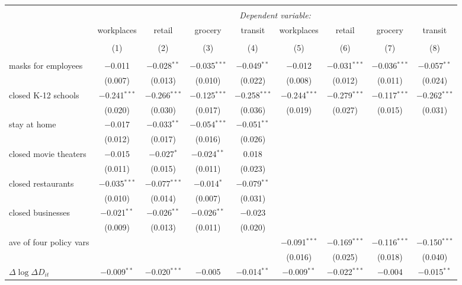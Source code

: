 \begin{tabular}{@{\extracolsep{1pt}}lcccccccc} 
\\[-1.8ex]\hline 
\hline \\[-1.8ex] 
 & \multicolumn{8}{c}{\textit{Dependent variable:}} \\ 
\cline{2-9} 
 & workplaces & retail & grocery & transit & workplaces & retail & grocery & transit \\ 
\\[-1.8ex] & (1) & (2) & (3) & (4) & (5) & (6) & (7) & (8)\\ 
\hline \\[-1.8ex] 
 masks for employees & $-$0.011 & $-$0.028$^{**}$ & $-$0.035$^{***}$ & $-$0.049$^{**}$ & $-$0.012 & $-$0.031$^{***}$ & $-$0.036$^{***}$ & $-$0.057$^{**}$ \\ 
  & (0.007) & (0.013) & (0.010) & (0.022) & (0.008) & (0.012) & (0.011) & (0.024) \\ 
  closed K-12 schools & $-$0.241$^{***}$ & $-$0.266$^{***}$ & $-$0.125$^{***}$ & $-$0.258$^{***}$ & $-$0.244$^{***}$ & $-$0.279$^{***}$ & $-$0.117$^{***}$ & $-$0.262$^{***}$ \\ 
  & (0.020) & (0.030) & (0.017) & (0.036) & (0.019) & (0.027) & (0.015) & (0.031) \\ 
  stay at home & $-$0.017 & $-$0.033$^{**}$ & $-$0.054$^{***}$ & $-$0.051$^{**}$ &  &  &  &  \\ 
  & (0.012) & (0.017) & (0.016) & (0.026) &  &  &  &  \\ 
  closed movie theaters & $-$0.015 & $-$0.027$^{*}$ & $-$0.024$^{**}$ & 0.018 &  &  &  &  \\ 
  & (0.011) & (0.015) & (0.011) & (0.023) &  &  &  &  \\ 
  closed restaurants & $-$0.035$^{***}$ & $-$0.077$^{***}$ & $-$0.014$^{*}$ & $-$0.079$^{**}$ &  &  &  &  \\ 
  & (0.010) & (0.014) & (0.007) & (0.031) &  &  &  &  \\ 
  closed businesses & $-$0.021$^{**}$ & $-$0.026$^{**}$ & $-$0.026$^{**}$ & $-$0.023 &  &  &  &  \\ 
  & (0.009) & (0.013) & (0.011) & (0.020) &  &  &  &  \\ 
  ave of four policy vars &  &  &  &  & $-$0.091$^{***}$ & $-$0.169$^{***}$ & $-$0.116$^{***}$ & $-$0.150$^{***}$ \\ 
  &  &  &  &  & (0.016) & (0.025) & (0.018) & (0.040) \\ 
  $\Delta \log \Delta D_{it}$ & $-$0.009$^{**}$ & $-$0.020$^{***}$ & $-$0.005 & $-$0.014$^{**}$ & $-$0.009$^{**}$ & $-$0.022$^{***}$ & $-$0.004 & $-$0.015$^{**}$ \\ 

\end{tabular}
